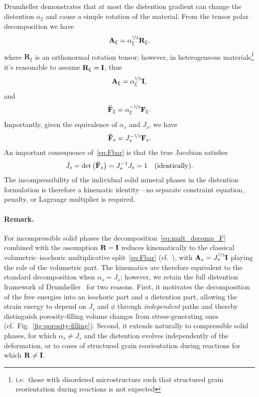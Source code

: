 \documentclass[11pt]{article}
\begin{document}
Drumheller \cite{drumheller2000} demonstrates that at most the distention gradient can change the distention $\alpha_\xi$ and cause a simple rotation of the material.  From the tensor polar decomposition we have
%
\begin{align}
  \mathbf{A}_\xi = \alpha_\xi^{\nicefrac{1}{3}} \mathbf{R}_\xi, \notag
\end{align}
%
where $\mathbf{R}_\xi$ is an orthonormal rotation tensor; however, in heterogeneous materials\footnote{i.e.\ those with disordered microstructure such that structured grain reorientation during reactions is not expected} it's reasonable to assume $\mathbf{R}_\xi = \mathbf{I}$, thus
%
\begin{align}
  \mathbf{A}_\xi = \alpha_\xi^{\nicefrac{1}{3}} \mathbf{I}, \notag
\end{align}
%
and
%
\begin{align}
  \mathbf{\bar F}_\xi = \alpha_\xi^{-\nicefrac{1}{3}} \mathbf{F}_\xi. \notag
\end{align}
%
Importantly, given the equivalence of $\alpha_s$ and $J_s$, we have
%
\begin{align}
  \mathbf{\bar F}_s = J_s^{-\nicefrac{1}{3}} \mathbf{F}_s.
  \label{eq:Fbar}
\end{align}
%
An important consequence of~\eqref{eq:Fbar} is that the true Jacobian satisfies
%
\begin{align*}
  \bar{J}_s = \det\left(\mathbf{\bar F}_s\right) = J_s^{-1} J_s = 1 \quad \text{(identically)}.
\end{align*}
%
The incompressibility of the individual solid mineral phases in the distention formulation is therefore a kinematic identity---no separate constraint equation, penalty, or Lagrange multiplier is required.

\paragraph{Remark.}  For incompressible solid phases the decomposition~\eqref{eq:mult_decomp_F} combined with the assumption $\mathbf{R} = \mathbf{I}$ reduces kinematically to the classical volumetric--isochoric multiplicative split~\eqref{eq:Fbar} (cf.\ \cite{flory1961}), with $\mathbf{A}_s = J_s^{\nicefrac{1}{3}}\mathbf{I}$ playing the role of the volumetric part.  The kinematics are therefore equivalent to the standard decomposition when $\alpha_s = J_s$; however, we retain the full distention framework of Drumheller~\cite{drumheller2000} for two reasons.  First, it motivates the decomposition of the free energies into an isochoric part and a distention part, allowing the strain energy to depend on $J_s$ and $\phi$ through \emph{independent} paths and thereby distinguish porosity-filling volume changes from stress-generating ones (cf.\ Fig.~\ref{fig:porosity-filling}).  Second, it extends naturally to compressible solid phases, for which $\alpha_s \neq J_s$ and the distention evolves independently of the deformation, or to cases of structured grain reorientation during reactions for which $\mathbf{R} \ne \mathbf{I}$.
\end{document}

